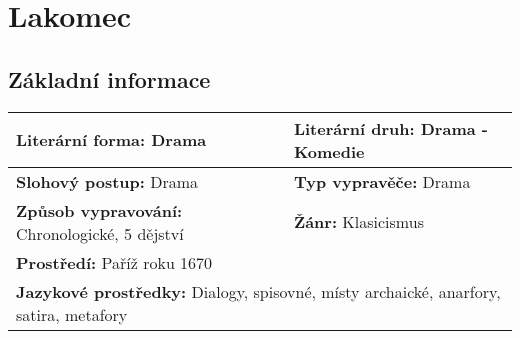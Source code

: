 \section{Lakomec}
\subsection*{Základní informace}
\begin{tabularx}{\linewidth}{l|l}
    \textbf{Literární forma:} Drama                       & \textbf{Literární druh:} Drama - Komedie                 \\
    \hline
    \textbf{Slohový postup:} Drama                        & \textbf{Typ vypravěče:} Drama                            \\
    \hline
    \textbf{Způsob vypravování:} Chronologické, 5 dějství & \textbf{Žánr:} Klasicismus                               \\
    \hline
    \multicolumn{2}{l}{\textbf{Prostředí:} Paříž roku 1670}                                                          \\
    \hline
    \multicolumn{2}{l}{\textbf{Jazykové prostředky:} Dialogy, spisovné, místy archaické, anarfory, satira, metafory} \\
\end{tabularx}

